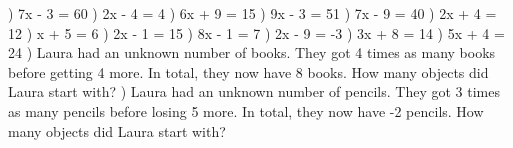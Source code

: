 \documentclass{article}%
\begin{document}
\newline%
\newline%
) 7x - 3 = 60%
\newline%
\newline%
) 2x - 4 = 4%
\newline%
\newline%
) 6x + 9 = 15%
\newline%
\newline%
) 9x - 3 = 51%
\newline%
\newline%
) 7x - 9 = 40%
\newline%
\newline%
) 2x + 4 = 12%
\newline%
\newline%
) x + 5 = 6%
\newline%
\newline%
) 2x - 1 = 15%
\newline%
\newline%
) 8x - 1 = 7%
\newline%
\newline%
) 2x - 9 = -3%
\newline%
\newline%
) 3x + 8 = 14%
\newline%
\newline%
) 5x + 4 = 24%
\newline%
\newline%
) Laura had an unknown number of books. They got 4 times as many books before getting 4 more. In total, they now have 8 books. How many objects did Laura start with?%
\newline%
\newline%
) Laura had an unknown number of pencils. They got 3 times as many pencils before losing 5 more. In total, they now have -2 pencils. How many objects did Laura start with?%
\end{document}
